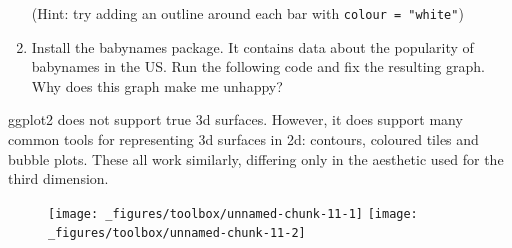 \begin{enumerate}
  (Hint: try adding an outline around each bar with
  \texttt{colour\ =\ "white"})
\item
  Install the babynames package. It contains data about the popularity
  of babynames in the US. Run the following code and fix the resulting
  graph. Why does this graph make me unhappy?

\begin{Shaded}
\begin{Highlighting}[]
\StringTok{ }\NormalTok{)}
\StringTok{ }
\StringTok{  }\NormalTok{()}
\end{Highlighting}
\end{Shaded}
\end{enumerate}


ggplot2 does not support true 3d surfaces. However, it does support many
common tools for representing 3d surfaces in 2d: contours, coloured
tiles and bubble plots. These all work similarly, differing only in the
aesthetic used for the third dimension. 
  

\begin{Shaded}
\begin{Highlighting}[]
\StringTok{ }
\StringTok{  }\NormalTok{(}\NormalTok{(}  

\StringTok{ }
\StringTok{  }\NormalTok{(}\NormalTok{(} 
\end{Highlighting}
\end{Shaded}

\begin{figure}[H]
  \texttt{[image: \_figures/toolbox/unnamed-chunk-11-1]}%
  \texttt{[image: \_figures/toolbox/unnamed-chunk-11-2]}
\end{figure}

